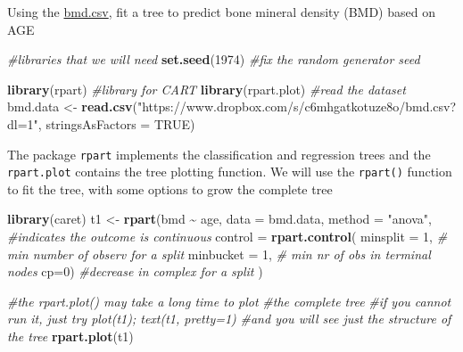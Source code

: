 \documentclass[
]{book}
\newenvironment{Shaded}{\begin{snugshade}}{\end{snugshade}}
\newcommand{\AttributeTok}[1]{\textcolor[rgb]{0.13,0.29,0.53}{#1}}
\newcommand{\CommentTok}[1]{\textcolor[rgb]{0.56,0.35,0.01}{\textit{#1}}}
\newcommand{\ConstantTok}[1]{\textcolor[rgb]{0.56,0.35,0.01}{#1}}
\newcommand{\DecValTok}[1]{\textcolor[rgb]{0.00,0.00,0.81}{#1}}
\newcommand{\FunctionTok}[1]{\textcolor[rgb]{0.13,0.29,0.53}{\textbf{#1}}}
\newcommand{\NormalTok}[1]{#1}
\newcommand{\OtherTok}[1]{\textcolor[rgb]{0.56,0.35,0.01}{#1}}
\newcommand{\SpecialCharTok}[1]{\textcolor[rgb]{0.81,0.36,0.00}{\textbf{#1}}}
\newcommand{\StringTok}[1]{\textcolor[rgb]{0.31,0.60,0.02}{#1}}
\begin{document}
Using the \href{https://www.dropbox.com/s/7wjsfdaf0wt2kg2/bmd.csv?dl=1}{bmd.csv},
fit a tree to predict bone mineral density (BMD)
based on AGE

\begin{Shaded}
\begin{Highlighting}[]
\CommentTok{\#libraries that we will need}
\FunctionTok{set.seed}\NormalTok{(}\DecValTok{1974}\NormalTok{) }\CommentTok{\#fix the random generator seed }
\end{Highlighting}
\end{Shaded}

\begin{Shaded}
\begin{Highlighting}[]
\FunctionTok{library}\NormalTok{(rpart)  }\CommentTok{\#library for CART}
\FunctionTok{library}\NormalTok{(rpart.plot)}
\CommentTok{\#read the dataset}
\NormalTok{bmd.data     }\OtherTok{\textless{}{-}} 
  \FunctionTok{read.csv}\NormalTok{(}\StringTok{"https://www.dropbox.com/s/c6mhgatkotuze8o/bmd.csv?dl=1"}\NormalTok{, }
           \AttributeTok{stringsAsFactors =} \ConstantTok{TRUE}\NormalTok{)}
\end{Highlighting}
\end{Shaded}

The package \texttt{rpart} implements the classification and regression trees and the
\texttt{rpart.plot} contains the tree plotting function. We will use the \texttt{rpart()}
function to fit the tree, with some options to grow the complete tree

\begin{Shaded}
\begin{Highlighting}[]
\FunctionTok{library}\NormalTok{(caret)}
\NormalTok{t1 }\OtherTok{\textless{}{-}} \FunctionTok{rpart}\NormalTok{(bmd }\SpecialCharTok{\textasciitilde{}}\NormalTok{ age,}
            \AttributeTok{data =}\NormalTok{ bmd.data, }
            \AttributeTok{method =} \StringTok{"anova"}\NormalTok{,         }\CommentTok{\#indicates the outcome is continuous}
            \AttributeTok{control =} \FunctionTok{rpart.control}\NormalTok{(}
                       \AttributeTok{minsplit =} \DecValTok{1}\NormalTok{,  }\CommentTok{\# min number of observ for a split }
                       \AttributeTok{minbucket =} \DecValTok{1}\NormalTok{, }\CommentTok{\# min nr of obs in terminal nodes}
                       \AttributeTok{cp=}\DecValTok{0}\NormalTok{)          }\CommentTok{\#decrease in complex for a split }
\NormalTok{)}

\CommentTok{\#the rpart.plot() may take a long time to plot}
\CommentTok{\#the complete tree}
\CommentTok{\#if you cannot run it, just try plot(t1); text(t1, pretty=1)}
\CommentTok{\#and you will see just the structure of the tree}
\FunctionTok{rpart.plot}\NormalTok{(t1)     }
\end{Highlighting}
\end{Shaded}
\end{document}
